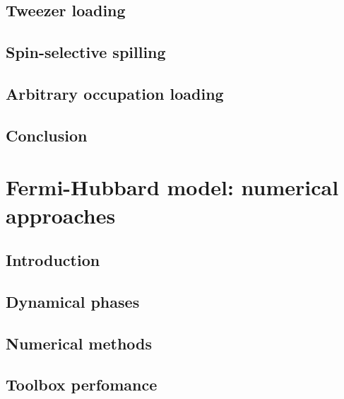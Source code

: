 \documentclass[twoside]{article}
\begin{document}
\subsection{Tweezer loading} \label{subsec:tweezer-loading}


\subsection{Spin-selective spilling} \label{subsec:spin-selective-spilling}


\subsection{Arbitrary occupation loading} \label{subsec:arbitrary-occupation-loading}


\subsection{Conclusion} \label{subsec:prep-fidelity}


\newpage
\section{Fermi-Hubbard model: numerical approaches} \label{sec:fhmodel}

\subsection{Introduction}

\subsection{Dynamical phases}

\subsection{Numerical methods}

\subsection{Toolbox perfomance}
\end{document}
